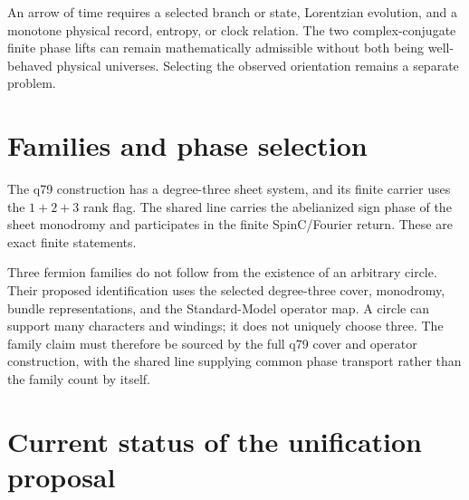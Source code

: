 \documentclass[11pt]{article}
\begin{document}
An arrow of time requires a selected branch or state, Lorentzian evolution,
and a monotone physical record, entropy, or clock relation. The two
complex-conjugate finite phase lifts can remain mathematically admissible
without both being well-behaved physical universes. Selecting the observed
orientation remains a separate problem.

\section{Families and phase selection}

The q79 construction has a degree-three sheet system, and its finite carrier
uses the \(1+2+3\) rank flag. The shared line carries the abelianized sign
phase of the sheet monodromy and participates in the finite SpinC/Fourier
return. These are exact finite statements.

Three fermion families do not follow from the existence of an arbitrary
circle. Their proposed identification uses the selected degree-three cover,
monodromy, bundle representations, and the Standard-Model operator map. A
circle can support many characters and windings; it does not uniquely choose
three. The family claim must therefore be sourced by the full q79 cover and
operator construction, with the shared line supplying common phase transport
rather than the family count by itself.

\section{Current status of the unification proposal}
\end{document}
